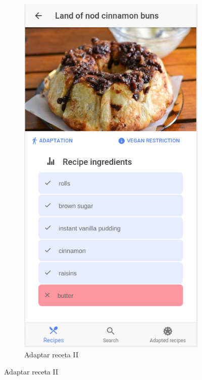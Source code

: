 \begin{figure}[H]
\begin{subfigure}[b]{0.32\linewidth}
        \label{fig:app_7}
    \end{subfigure}
    \begin{subfigure}[b]{0.3235
    \linewidth}
        \includegraphics[width=\linewidth]{imagenes/app/pantallas/ejemplo2.png}
        \caption{Adaptar receta II}

\end{subfigure}
\end{figure}
